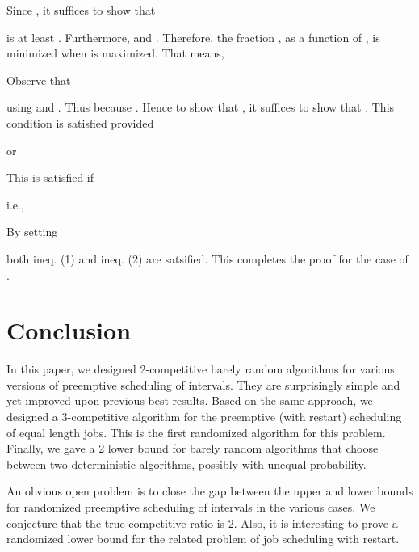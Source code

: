 \documentclass[11pt]{article}
\begin{document}
Since , it suffices to show that

is at least .
Furthermore,  and
 .
Therefore, the fraction , as a function of ,
is minimized when  is maximized.
That means,

Observe that 

 
using  and .
Thus 
because .
Hence to show that , it suffices to
show that .
This condition is satisfied provided

or

This is satisfied if

i.e.,

By setting

both ineq. (1) and ineq. (2) are satsified.
This completes the proof for the case of .


\section{Conclusion}

In this paper, we designed 2-competitive barely random algorithms
for various versions of preemptive scheduling of intervals.
They are surprisingly simple and yet improved upon previous best
results.
Based on the same approach, we designed a 3-competitive algorithm
for the preemptive (with restart) scheduling of equal length jobs.
This is the first randomized algorithm for this problem.
Finally, we gave a 2 lower bound for barely random algorithms
that choose between two deterministic algorithms, possibly
with unequal probability.

An obvious open problem is to close the gap between the upper and
lower bounds for randomized preemptive scheduling of intervals
in the various cases.
We conjecture that the true competitive ratio is 2.
Also, it is interesting to prove a randomized lower bound for
the related problem of job scheduling with restart.



\end{document}
